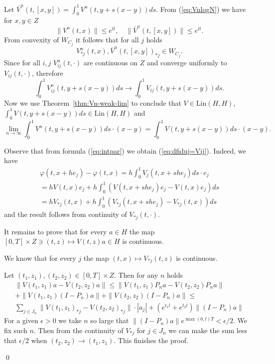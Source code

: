 Let $\overline{V}^n(t,[x,y])=\int^1_0 V^n(t,y+s(x- y))ds$.  From (\ref{eq:VnlogN})  we have for $x,y \in Z$
\begin{equation}
  \|V^n(t,x)\| \leq e^{lt}, \quad   \|\overline{V}^n(t,[x,y])\| \leq e^{lt}.
\end{equation}
From convexity of $W_{C_j}$ it follows that for all $j$ holds
\begin{equation}
  V_{\ast j}^n(t,x),\overline{V}^n(t,[x,y])_{\ast j} \in W_{C_j}.
\end{equation}
Since for all $i,j$  $V^n_{ij}(t,\cdot)$ are continuous on $Z$ and converge uniformly to $V_{ij}(t,\cdot)$, therefore
\begin{equation}
  \int^1_0 V^n_{ij}(t,y+s(x- y))ds \to \int^1_0 V_{ij}(t,y+s(x- y))ds.
\end{equation}
Now we use Theorem~\ref{thm:Vn-weak-lim} to conclude that $V \in \mbox{Lin}(H,H)$, $\int^1_0 V(t,y+s(x- y))ds \in \mbox{Lin}(H,H)$ and
\begin{equation}
  \lim_{n \to \infty} \int^1_0 V^n(t,y+s(x- y))ds \cdot (x-y) = \int^1_0 V(t,y+s(x- y))ds \cdot (x-y).
\end{equation}

Observe that from  formula (\ref{eq:intpar}) we obtain
 (\ref{eq:dfiduj=Vij}). Indeed, we have
\begin{eqnarray*}
  \varphi(t,x+he_j) -  \varphi(t,x) = h \int_0^1 V_{j}(t,x+she_j)ds \cdot e_j \\
  = h  V(t,x)e_j + h \int_0^1 \left( V(t,x+she_j)e_j - V(t,x)e_j \right)ds\\
  = h  V_{\ast j}(t,x) + h \int_0^1 \left( V_{\ast j}(t,x+she_j) - V_{\ast j}(t,x) \right)ds
\end{eqnarray*}
and the result follows from continuity of $V_{\ast j}(t,\cdot)$.

It remains to prove that for every $a \in H$ the map $[0,T] \times Z \ni (t,z) \mapsto V(t,z)a \in H$ is continuous.

We know that for every $j$ the map $(t,x) \mapsto V_{\ast j}(t,z)$ is continuous.

Let $(t_1,z_1), (t_2,z_2) \in [0,T] \times Z$. Then  for any $n$ holds
\begin{eqnarray*}
  \| V(t_1,z_1)a - V(t_2,z_2)a \| \leq \| V(t_1,z_1)P_n a - V(t_2,z_2)P_n a \| \\
   +  \| V(t_1,z_1)(I-P_n) a \| + \| V(t_2,z_2)(I-P_n) a \| \leq  \\
       \sum_{j \in J_n} \|V(t_1,z_1)_{\ast j} - V(t_2,z_2)_{\ast j}\| \cdot |a_j| + (e^{t_1 l} + e^{t_2 l}) \|(I-P_n)a\|
\end{eqnarray*}
For a given $\epsilon>0$ we take $n$ so large that $ \|(I-P_n)a\|e^{\max(0,l)T} < \epsilon/2$. We fix such $n$. Then from the continuity of $V_{\ast j}$ for $j\in J_n$
we can make the sum less that $\epsilon/2$ when $(t_2,z_2) \to (t_1,z_1)$. This finishes the proof.

\qed






